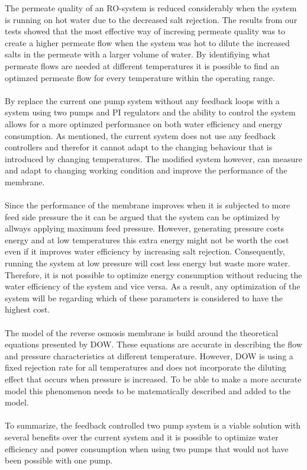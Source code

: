 The permeate quality of an RO-system is reduced considerably when the system is running on hot water due to the decreased salt rejection. The results from our tests showed that the most effective way of incresing permeate quality was to create a higher permeate flow when the system was hot to dilute the increased salts in the permeate with a larger volume of water. By identifiying what permeate flows are needed at different temperatures it is possible to find an optimzed permeate flow for every temperature within the operating range.\\
 \\
By replace the current one pump system without any feedback loops with a system using two pumps and PI regulators and the ability to control the system allows for a more optimzed performance on both water efficiency and energy consumption. As mentioned, the current system does not use any feedback controllers and therefor it cannot adapt to the changing behaviour that is introduced by changing temperatures. The modified system however, can measure and adapt to changing working condition and improve the performance of the membrane. \\
 \\
Since the performance of the membrane improves when it is subjected to more feed side pressure the it can be argued that the system can be optimized by allways applying maximum feed pressure. However, generating pressure costs energy and at low temperatures this extra energy might not be worth the cost even if it improves water efficiency by increasing salt rejection. Consequently, running the system at low pressure will cost less energy but waste more water. Therefore, it is not possible to optimize energy consumption without reducing the water efficiency of the system and vice versa. As a result, any optimization of the system will be regarding which of these parameters is considered to have the highest cost. \\
 \\
The model of the reverse osmosis membrane is build around the theoretical equations presented by DOW. These equations are accurate in describing the flow and pressure characteristics at different temperature. However, DOW is using a fixed rejection rate for all temperatures and does not incorporate the diluting effect that occurs when pressure is increased.  To be able to make a more accurate model this phenomenon needs to be matematically described and added to the model. \\
 \\
To summarize, the feedback controlled two pump system is a viable solution with several benefits over the current system and it is possible to optimize water efficiency and power consumption when using two pumps that would not have been possible with one pump. 